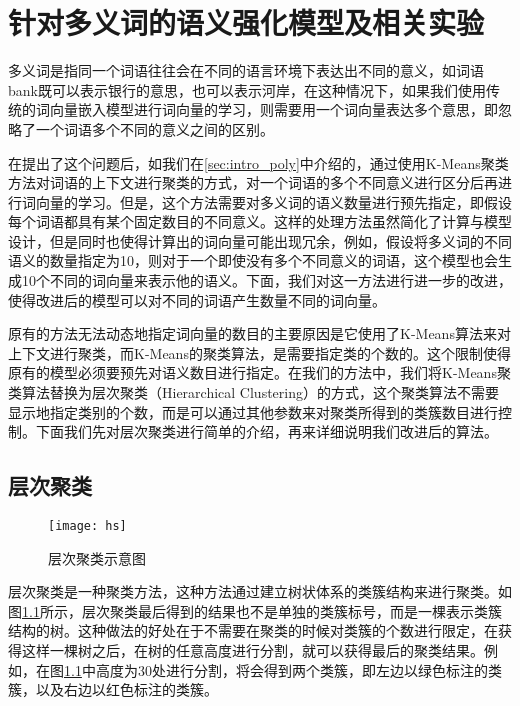 \iffalse



\fi

\chapter{针对多义词的语义强化模型及相关实验}

多义词是指同一个词语往往会在不同的语言环境下表达出不同的意义，如词语bank既可以表示银行的意思，也可以表示河岸，在这种情况下，如果我们使用传统的词向量嵌入模型进行词向量的学习，则需要用一个词向量表达多个意思，即忽略了一个词语多个不同的意义之间的区别。

在\citep{bengio2006neural}提出了这个问题后，如我们在\ref{sec:intro_poly}中介绍的，\citep{huang2012improving}通过使用K-Means聚类方法对词语的上下文进行聚类的方式，对一个词语的多个不同意义进行区分后再进行词向量的学习。但是，这个方法需要对多义词的语义数量进行预先指定，即假设每个词语都具有某个固定数目的不同意义。这样的处理方法虽然简化了计算与模型设计，但是同时也使得计算出的词向量可能出现冗余，例如，假设将多义词的不同语义的数量指定为10，则对于一个即使没有多个不同意义的词语，这个模型也会生成10个不同的词向量来表示他的语义。下面，我们对这一方法进行进一步的改进，使得改进后的模型可以对不同的词语产生数量不同的词向量。

原有的方法无法动态地指定词向量的数目的主要原因是它使用了K-Means算法来对上下文进行聚类，而K-Means的聚类算法，是需要指定类的个数的。这个限制使得原有的模型必须要预先对语义数目进行指定。在我们的方法中，我们将K-Means聚类算法替换为层次聚类（Hierarchical Clustering）\citep{johnson1967hierarchical}的方式，这个聚类算法不需要显示地指定类别的个数，而是可以通过其他参数来对聚类所得到的类簇数目进行控制。下面我们先对层次聚类进行简单的介绍，再来详细说明我们改进后的算法。

\section{层次聚类}

\begin{figure}
\centering
\texttt{[image: hs]}
\caption{层次聚类示意图}
\label{fig:hs}
\end{figure}

层次聚类是一种聚类方法，这种方法通过建立树状体系的类簇结构来进行聚类。如图\ref{fig:hs}所示，层次聚类最后得到的结果也不是单独的类簇标号，而是一棵表示类簇结构的树。这种做法的好处在于不需要在聚类的时候对类簇的个数进行限定，在获得这样一棵树之后，在树的任意高度进行分割，就可以获得最后的聚类结果。例如，在图\ref{fig:hs}中高度为30处进行分割，将会得到两个类簇，即左边以绿色标注的类簇，以及右边以红色标注的类簇。

